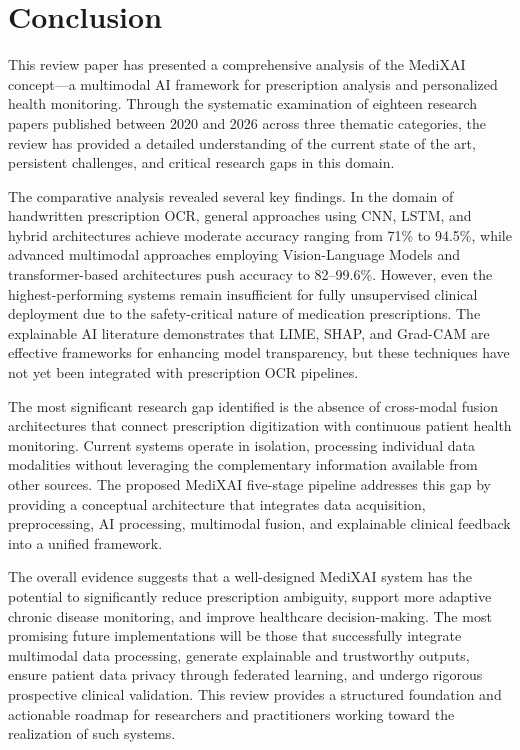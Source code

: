 \documentclass[conference]{IEEEtran}
\begin{document}
\section{Conclusion}
\label{sec:conclusion}

This review paper has presented a comprehensive analysis of the MediXAI concept---a multimodal AI framework for prescription analysis and personalized health monitoring. Through the systematic examination of eighteen research papers published between 2020 and 2026 across three thematic categories, the review has provided a detailed understanding of the current state of the art, persistent challenges, and critical research gaps in this domain.

The comparative analysis revealed several key findings. In the domain of handwritten prescription OCR, general approaches using CNN, LSTM, and hybrid architectures achieve moderate accuracy ranging from 71\% to 94.5\%, while advanced multimodal approaches employing Vision-Language Models and transformer-based architectures push accuracy to 82--99.6\%. However, even the highest-performing systems remain insufficient for fully unsupervised clinical deployment due to the safety-critical nature of medication prescriptions. The explainable AI literature demonstrates that LIME, SHAP, and Grad-CAM are effective frameworks for enhancing model transparency, but these techniques have not yet been integrated with prescription OCR pipelines.

The most significant research gap identified is the absence of cross-modal fusion architectures that connect prescription digitization with continuous patient health monitoring. Current systems operate in isolation, processing individual data modalities without leveraging the complementary information available from other sources. The proposed MediXAI five-stage pipeline addresses this gap by providing a conceptual architecture that integrates data acquisition, preprocessing, AI processing, multimodal fusion, and explainable clinical feedback into a unified framework.

The overall evidence suggests that a well-designed MediXAI system has the potential to significantly reduce prescription ambiguity, support more adaptive chronic disease monitoring, and improve healthcare decision-making. The most promising future implementations will be those that successfully integrate multimodal data processing, generate explainable and trustworthy outputs, ensure patient data privacy through federated learning, and undergo rigorous prospective clinical validation. This review provides a structured foundation and actionable roadmap for researchers and practitioners working toward the realization of such systems.




\end{document}
